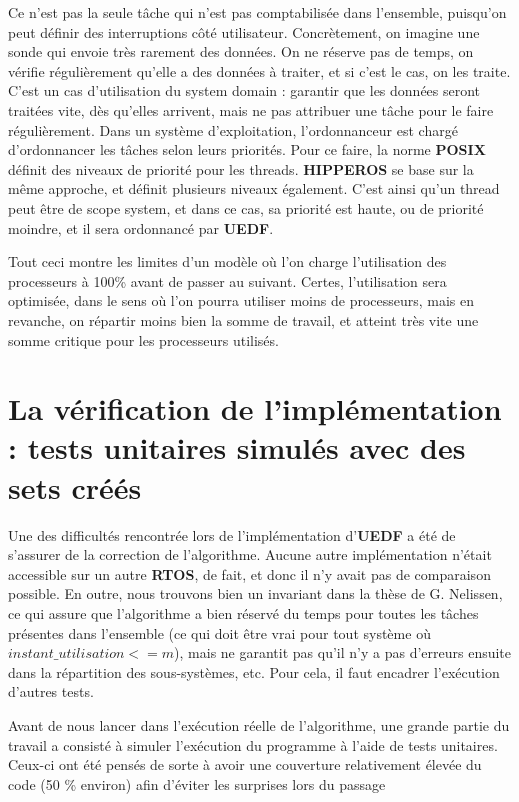 	Ce n'est pas la seule tâche qui n'est pas comptabilisée dans l'ensemble, puisqu'on peut définir des 
	interruptions côté utilisateur. 
	Concrètement, on imagine une sonde qui envoie très rarement des données. On ne réserve 
	pas de temps, on vérifie régulièrement qu'elle a des données à traiter, et si c'est le cas, on les traite.\\
	C'est un cas d'utilisation du system domain : garantir que les données seront traitées vite, dès qu'elles arrivent, 
	mais ne pas attribuer une tâche pour le faire régulièrement.
	Dans un système d'exploitation, l'ordonnanceur est chargé d'ordonnancer les tâches selon leurs priorités. 
	Pour ce faire, la norme \textbf{POSIX} définit des niveaux de priorité pour les threads. 
	\textbf{HIPPEROS }se base sur la même approche, et définit plusieurs niveaux également. C'est ainsi 
	qu'un thread peut être de scope system, et dans ce cas, sa priorité est haute, ou de priorité 
	moindre, et il sera ordonnancé par \textbf{UEDF}.\newline
	
	Tout ceci montre les limites d'un modèle où l'on charge l'utilisation des processeurs à 100\% avant de 
	passer au suivant. Certes, l'utilisation sera optimisée, dans le sens où l'on 
	pourra utiliser moins de processeurs, mais en revanche, on 
	répartir moins bien la somme de travail, et atteint très vite une somme critique pour les processeurs utilisés.

\section{La vérification de l'implémentation : tests unitaires simulés avec des sets créés}

	Une des difficultés rencontrée lors de l'implémentation d'\textbf{UEDF} a été de s'assurer de la correction de l'algorithme. 
	Aucune autre implémentation n'était accessible sur un autre \textbf{RTOS}, de fait, et donc il n'y avait pas de 
	comparaison possible. En outre, nous trouvons bien un invariant dans la thèse de G. Nelissen, ce qui assure 
	que l'algorithme a bien réservé du temps pour toutes les tâches présentes dans l'ensemble 
	(ce qui doit être vrai pour tout système où $instant\_utilisation <= m$), mais ne garantit pas 
	qu'il n'y a pas d'erreurs ensuite dans la répartition des sous-systèmes, etc. Pour cela, il faut encadrer 
	l'exécution d'autres tests. \newline

	Avant de nous lancer dans l'exécution réelle de l'algorithme, une grande partie du travail a consisté 
	à simuler l'exécution du programme à l'aide de tests unitaires. Ceux-ci ont été pensés de sorte à avoir 
	une couverture relativement élevée du code (50 \% environ) afin d'éviter les surprises lors du passage 
	

